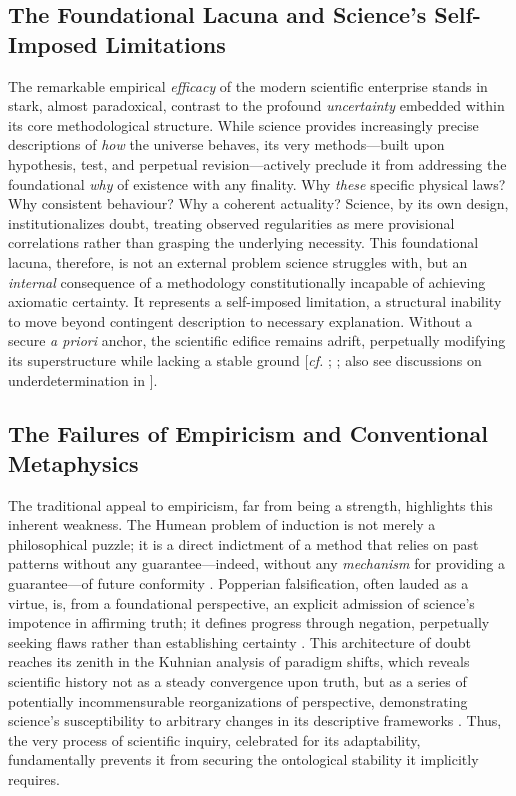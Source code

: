 \documentclass[11pt, a4paper]{article}
\begin{document}
\subsection{The Foundational Lacuna and Science's Self-Imposed Limitations}
The remarkable empirical \textit{efficacy} of the modern scientific enterprise stands in stark, almost paradoxical, contrast to the profound \textit{uncertainty} embedded within its core methodological structure. While science provides increasingly precise descriptions of \textit{how} the universe behaves, its very methods—built upon hypothesis, test, and perpetual revision—actively preclude it from addressing the foundational \textit{why} of existence with any finality. Why \textit{these} specific physical laws? Why consistent behaviour? Why a coherent actuality? Science, by its own design, institutionalizes doubt, treating observed regularities as mere provisional correlations rather than grasping the underlying necessity. This foundational lacuna, therefore, is not an external problem science struggles with, but an \textit{internal} consequence of a methodology constitutionally incapable of achieving axiomatic certainty. It represents a self-imposed limitation, a structural inability to move beyond contingent description to necessary explanation. Without a secure \textit{a priori} anchor, the scientific edifice remains adrift, perpetually modifying its superstructure while lacking a stable ground [\textit{cf.} \citealp{hume1748}; \citealp{goodman1955}; also see discussions on underdetermination in \citealp{laudan1990}].

\subsection{The Failures of Empiricism and Conventional Metaphysics}
The traditional appeal to empiricism, far from being a strength, highlights this inherent weakness. The Humean problem of induction is not merely a philosophical puzzle; it is a direct indictment of a method that relies on past patterns without any guarantee—indeed, without any \textit{mechanism} for providing a guarantee—of future conformity \citep{hume1748}. Popperian falsification, often lauded as a virtue, is, from a foundational perspective, an explicit admission of science's impotence in affirming truth; it defines progress through negation, perpetually seeking flaws rather than establishing certainty \citep{popper1959}. This architecture of doubt reaches its zenith in the Kuhnian analysis of paradigm shifts, which reveals scientific history not as a steady convergence upon truth, but as a series of potentially incommensurable reorganizations of perspective, demonstrating science's susceptibility to arbitrary changes in its descriptive frameworks \citep{kuhn1962}. Thus, the very process of scientific inquiry, celebrated for its adaptability, fundamentally prevents it from securing the ontological stability it implicitly requires.
\end{document}
